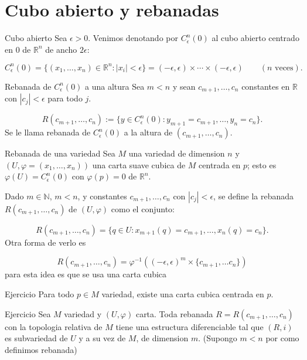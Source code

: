 \section{Cubo abierto y rebanadas}
\begin{bookdefinition}{Cubo abierto}
Sea $\epsilon > 0$. Venimos denotando por $C_\epsilon^n(0)$ al cubo abierto centrado en $0$ de $\mathbb R^n$ de ancho $2\epsilon$:

\[
C_\epsilon^n(0)=\{(x_1,\ldots,x_n)\in\mathbb R^n: |x_i|<\epsilon\}=(-\epsilon,\epsilon)\times\cdots\times(-\epsilon,\epsilon)\qquad (n\text{ veces}).
\]
\end{bookdefinition}
\begin{bookdefinition}{Rebanada de $C_{\epsilon}^{n}(0)$ a una altura}
Sea $m<n$ y sean $c_{m+1},\ldots,c_n$ constantes en $\mathbb R$ con $|c_j|<\epsilon$ para todo $j$.

\[
R(c_{m+1},\ldots,c_n):=\{y\in C_\epsilon^n(0):y_{m+1}=c_{m+1},\ldots,y_n=c_n\}.
\]
Se le llama rebanada de $C_\epsilon^n(0)$ a la altura de $(c_{m+1},\ldots,c_n)$.

\end{bookdefinition}
\begin{bookdefinition}{Rebanada de una variedad}
Sea $M$ una variedad de dimension $n$ y $(U,\varphi=(x_1,\ldots,x_n))$ una carta suave cubica de $M$ centrada en $p$; esto es $\varphi(U)=C_\epsilon^n(0)$ con $\varphi(p)=0$ de $\mathbb R^n$.

Dado $m\in\mathbb N$, $m<n$, y constantes $c_{m+1},\ldots,c_n$ con $|c_j|<\epsilon$, se define la rebanada $R(c_{m+1},\ldots,c_n)$ de $(U,\varphi)$ como el conjunto:

\[
R(c_{m+1},\ldots,c_n)=\{q\in U:x_{m+1}(q)=c_{m+1},\ldots,x_n(q)=c_n\}.
\]
Otra forma de verlo es

\[
R(c_{m+1},\ldots,c_{n})=\varphi ^{-1}((-\epsilon,\epsilon)^{m} \times \{ c_{m+1},\ldots c_{n} \})
\]
para esta idea es que se usa una carta cubica

\end{bookdefinition}
\begin{bookremark}{Ejercicio}
Para todo $p\in M$ variedad, existe una carta cubica centrada en $p$.

\end{bookremark}
\begin{bookproposition}{Ejercicio}
Sea $M$ variedad y $(U,\varphi)$ carta. Toda rebanada $R=R(c_{m+1},\ldots,c_n)$ con la topologia relativa de $M$ tiene una estructura diferenciable tal que $(R,i)$ es subvariedad de $U$ y a su vez de $M$, de dimension $m$. (Supongo $m<n$ por como definimos rebanada)

\end{bookproposition}
